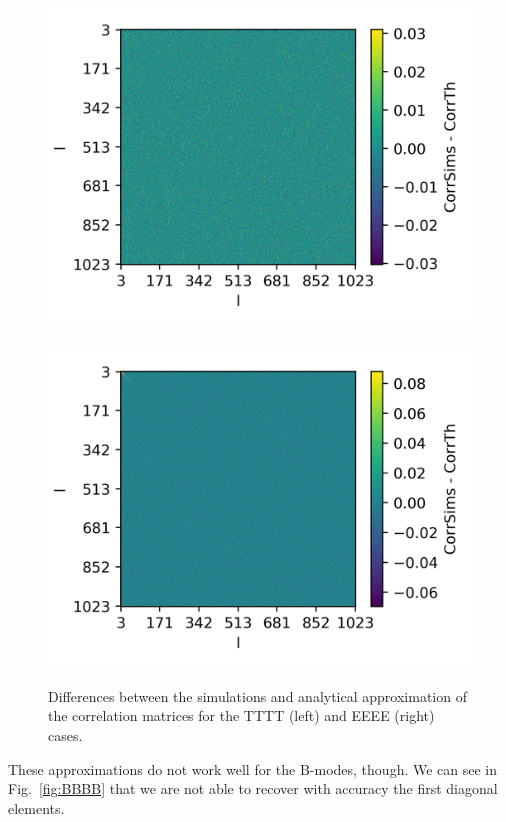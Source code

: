 \documentclass[useAMS,usenatbib]{mn2e}
\begin{document}
\begin{figure} %
  \centering
  \includegraphics[width=\columnwidth]{./figures/run_sph_Efstathiou_TTTT_correlation_difference.png}~
  \includegraphics[width=\columnwidth]{./figures/run_sph_Efstathiou_EEEE_correlation_difference.png}
  \caption{Differences between the simulations and analytical approximation of
    the correlation matrices for the TTTT (left) and EEEE (right) cases.}
  \label{fig:TTTT_EEEE_corr}
\end{figure}

These approximations do not work well for the B-modes, though. We can see in
Fig.~\ref{fig:BBBB} that we are not able to recover with accuracy the first
diagonal elements.
\end{document}
